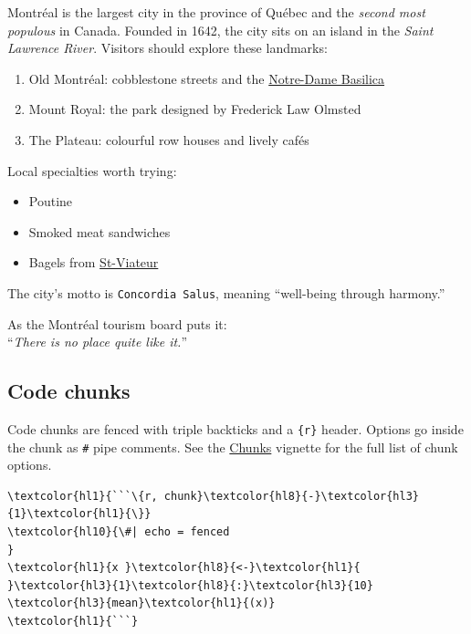 Montréal is the largest city in the province of Québec and the \emph{second most populous} in Canada. Founded in 1642, the city sits on an island in the \emph{Saint Lawrence River}. Visitors should explore these landmarks:

\begin{enumerate}
\item Old Montréal: cobblestone streets and the \href{https://www.basiliquenotredame.ca}{Notre-Dame Basilica}


\item Mount Royal: the park designed by Frederick Law Olmsted


\item The Plateau: colourful row houses and lively cafés


\end{enumerate}

Local specialties worth trying:

\begin{itemize}
\item Poutine


\item Smoked meat sandwiches


\item Bagels from \href{https://www.stviateurbagel.com}{St-Viateur}


\end{itemize}

The city's motto is \texttt{Concordia Salus}\footnotemark[1], meaning ``well-being through harmony.''

As the Montréal tourism board puts it:\\
``\emph{There is no place quite like it.}''


\subsection{Code chunks}
\label{code-chunks}

Code chunks are fenced with triple backticks and a \texttt{\{r\}} header. Options go inside the chunk as \texttt{\#\textbar{}} pipe comments. See the \href{/code/chunks.html}{Chunks} vignette for the full list of chunk options.



\begin{srccode}
\begin{Verbatim}[commandchars=\\\{\}]
\textcolor{hl1}{```\{r, chunk}\textcolor{hl8}{-}\textcolor{hl3}{1}\textcolor{hl1}{\}}
\textcolor{hl10}{\#| echo = fenced
}
\textcolor{hl1}{x }\textcolor{hl8}{<-}\textcolor{hl1}{ }\textcolor{hl3}{1}\textcolor{hl8}{:}\textcolor{hl3}{10}
\textcolor{hl3}{mean}\textcolor{hl1}{(x)}
\textcolor{hl1}{```}
\end{Verbatim}
\end{srccode}

